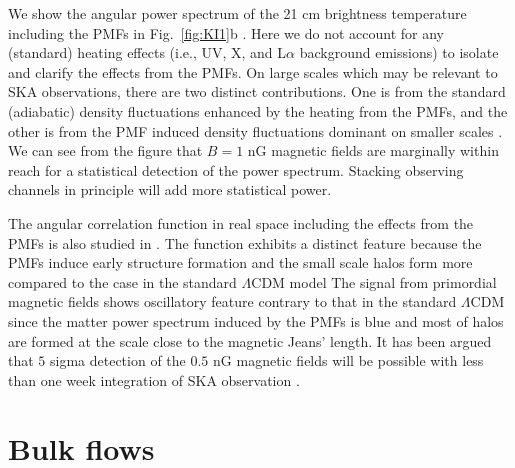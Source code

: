 \documentclass{PoS}
\begin{document}
We show the angular power spectrum of the 21 cm brightness temperature
including the PMFs in Fig.~\ref{fig:KI1}b
\cite{2014arXiv1403.2608S}. Here we do not account for any (standard)
heating effects (i.e., UV, X, and L$\alpha$ background emissions) to isolate and
clarify the effects from the PMFs.  On large scales which may be
relevant to SKA 
observations, there are two distinct contributions. One is from the
standard (adiabatic) density fluctuations enhanced by the heating from
the PMFs, and the other is from the PMF induced density fluctuations
dominant on smaller scales
\cite{2006MNRAS.372.1060T,2009ApJ...692..236S}. We can see from the
figure that $B=1$ nG
magnetic fields are marginally within reach for a statistical detection
of the power spectrum. Stacking observing channels in principle will add
more statistical power.

The angular correlation function in real space including the effects
from the PMFs is also studied in \cite{2009JCAP...11..021S}.  The
function exhibits a distinct feature because the PMFs induce early
structure formation and the small scale halos form more compared to the
case in the standard $\Lambda$CDM model The signal from primordial
magnetic fields shows oscillatory feature contrary to that in the
standard $\Lambda$CDM since the matter power spectrum induced by the
PMFs is blue and most of halos are formed at the scale close to the
magnetic Jeans' length. It has been argued that $5$ sigma detection of
the $0.5$ nG magnetic fields will be possible with less than one week
integration of SKA observation \cite{2009JCAP...11..021S}.

\section{Bulk flows}
\end{document}
